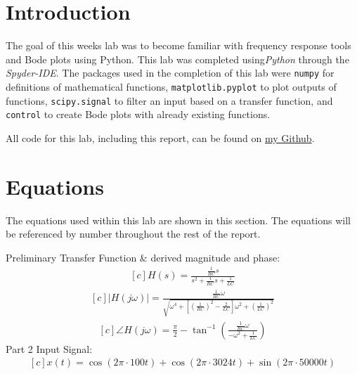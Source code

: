 \documentclass[12pt]{report}
\begin{document}
\section{Introduction}
The goal of this weeks lab was to become familiar with frequency response tools and Bode plots using Python.
This lab was completed using\textit{Python} through the \textit{Spyder-IDE}. The packages used in the completion 
of this lab were \texttt{numpy} for definitions of mathematical functions, \texttt{matplotlib.pyplot} to plot outputs 
of functions, \texttt{scipy.signal} to filter an input based on a transfer function, and \texttt{control} to create
Bode plots with already existing functions.

All code for this lab, including this report, can be found on \href{http://github.com/mac-edmondson}{my Github}.
\section{Equations}\label{section: eq}
The equations used within this lab are shown in this section. The equations will be referenced by number throughout
the rest of the report.

Preliminary Transfer Function \& derived magnitude and phase:
\begin{equation}\label{eq: cirTF} %
  \begin{aligned}[c]
    H(s) = \frac{\frac{1}{RC}s}{s^2 + \frac{1}{RC}s + \frac{1}{LC}} 
  \end{aligned}
\end{equation}
\begin{equation}\label{eq: cirTFmag}
  \begin{aligned}[c]
    |H(j\omega)| = \frac{\frac{1}{RC}\omega}{\sqrt{\omega^4 + [(\frac{1}{RC})^2 - \frac{2}{LC}]\omega^2 + (\frac{1}{LC})^2}}
  \end{aligned}
\end{equation}
\begin{equation}\label{eq: cirTFang}
  \begin{aligned}[c]
    \angle H(j\omega) = \frac{\pi}{2} - \tan^{-1}{(\frac{\frac{1}{RC}\omega}{-\omega^2 + \frac{1}{LC}})}
  \end{aligned}
\end{equation}
Part 2 Input Signal:
\begin{equation}\label{eq: inForFilter}
  \begin{aligned}[c]
    x(t) = \cos{(2\pi\cdot 100t)} + \cos{(2\pi\cdot 3024t)} + \sin(2\pi\cdot 50000t)
  \end{aligned}
\end{equation}
\end{document}
